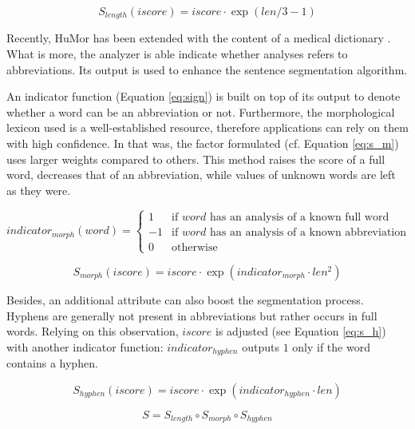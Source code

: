 \begin{equation} \label{eq:s_l}
S_{length}(iscore)= iscore \cdot \exp{(len/3-1)}
\end{equation}

Recently, HuMor \cite{Proszeky1994,Proszeky2005}  has been extended with the content of a medical dictionary \cite{Orosz2013}. 
What is more, the analyzer is able indicate whether analyses refers to abbreviations.
Its output is used to enhance the sentence segmentation algorithm.  

An indicator function (Equation \eqref{eq:sign}) is built on top of its output to denote whether a word can be an abbreviation or not.
Furthermore, the morphological lexicon used is a well-established resource, therefore applications can rely on them with high confidence.
In that was, the factor formulated (cf. Equation \eqref{eq:s_m}) uses larger weights compared to others. 
This method raises the score of a full word, decreases that of an abbreviation, while values of unknown words are left as they were.

\begin{equation}\label{eq:sign}
 indicator_{morph}(word) =
  \begin{cases}
   1  & \text{if $word$ has an analysis of a known full word} \\
   -1 & \text{if $word$ has an analysis of a known abbreviation} \\
   0  & \text{otherwise}
  \end{cases}
\end{equation}

\begin{equation} \label{eq:s_m}
S_{morph}(iscore)= iscore \cdot \exp{( indicator_{morph} \cdot len^2)}
\end{equation}

Besides, an additional attribute can also boost the segmentation process.
Hyphens are generally not present in abbreviations but rather occurs in full words. 
Relying on this observation, $iscore$ is adjusted (see Equation \eqref{eq:s_h}) with another indicator function:
$indicator_{hyphen}$ outputs $1$ only if the word contains a hyphen. 

\begin{equation} \label{eq:s_h}
S_{hyphen}(iscore)= iscore \cdot \exp{(indicator_{hyphen} \cdot len)}
\end{equation}

\begin{equation} \label{eq:scaling}
S = S_{length} \circ S_{morph} \circ S_{hyphen}
\end{equation}

